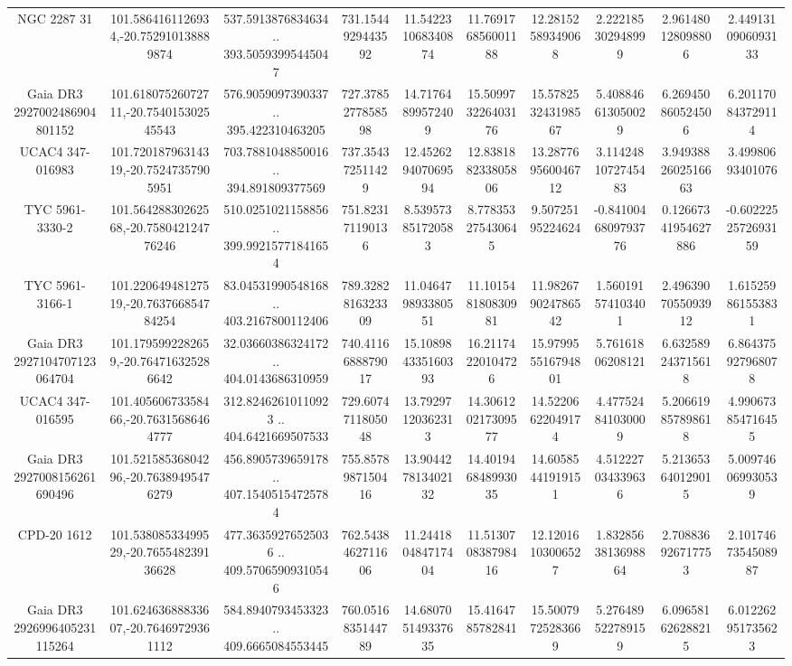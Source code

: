 \begin{table}
\begin{tabular}{cccccccccc}
NGC  2287    31 & 101.5864161126934,-20.752910138889874 & 537.5913876834634 .. 393.50593995445047 & 731.1544929443592 & 11.542231068340874 & 11.769176856001188 & 12.28152589349068 & 2.222185302948999 & 2.961480128098806 & 2.4491310906093133 \\
Gaia DR3 2927002486904801152 & 101.61807526072711,-20.754015302545543 & 576.9059097390337 .. 395.422310463205 & 727.3785277858598 & 14.71764899572409 & 15.509973226403176 & 15.578253243198567 & 5.408846613050029 & 6.269450860524506 & 6.201170843729114 \\
UCAC4 347-016983 & 101.72018796314319,-20.75247357905951 & 703.7881048850016 .. 394.891809377569 & 737.354372511429 & 12.452629407069594 & 12.838188233805806 & 13.287769560046712 & 3.1142481072745483 & 3.9493882602516663 & 3.49980693401076 \\
TYC 5961-3330-2 & 101.56428830262568,-20.758042124776246 & 510.0251021158856 .. 399.99215771841654 & 751.823171190136 & 8.539573851720583 & 8.778353275430645 & 9.50725195224624 & -0.8410046809793776 & 0.12667341954627886 & -0.6022252572693159 \\
TYC 5961-3166-1 & 101.22064948127519,-20.763766854784254 & 83.04531990548168 .. 403.2167800112406 & 789.3282816323309 & 11.046479893380551 & 11.101548180830981 & 11.982679024786542 & 1.560191574103401 & 2.4963907055093912 & 1.615259861553831 \\
Gaia DR3 2927104707123064704 & 101.1795992282659,-20.764716325286642 & 32.03660386324172 .. 404.0143686310959 & 740.4116688879017 & 15.108984335160393 & 16.21174220104726 & 15.979955516794801 & 5.76161806208121 & 6.632589243715618 & 6.864375927968078 \\
UCAC4 347-016595 & 101.40560673358466,-20.76315686464777 & 312.82462610110923 .. 404.6421669507533 & 729.6074711805048 & 13.79297120362313 & 14.306120217309577 & 14.52206622049174 & 4.477524841030009 & 5.206619857898618 & 4.990673854716455 \\
Gaia DR3 2927008156261690496 & 101.52158536804296,-20.76389495476279 & 456.8905739659178 .. 407.15405154725784 & 755.8578987150416 & 13.904427813402132 & 14.401946848993035 & 14.60585441919151 & 4.512227034339636 & 5.213653640129015 & 5.009746069930539 \\
CPD-20  1612 & 101.53808533499529,-20.765548239136628 & 477.36359276525036 .. 409.57065909310546 & 762.5438462711606 & 11.244180484717404 & 11.513070838798416 & 12.12016103006527 & 1.8328563813698864 & 2.708836926717753 & 2.1017467354508987 \\
Gaia DR3 2926996405231115264 & 101.62463688833607,-20.76469729361112 & 584.8940793453323 .. 409.6665084553445 & 760.0516835144789 & 14.680705149337635 & 15.4164785782841 & 15.50079725283669 & 5.276489522789159 & 6.096581626288215 & 6.012262951735623 \\

\end{tabular}
\end{table}
